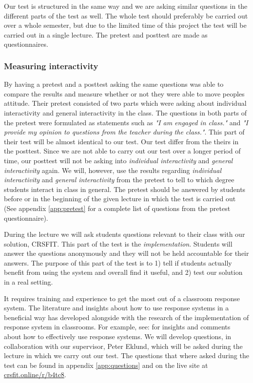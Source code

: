 Our test is structured in the same way and we are asking similar questions in the different parts of the test as well. The whole test should preferably be carried out over a whole semester, but due to the limited time of this project the test will be carried out in a single lecture. The pretest and posttest are made as questionnaires. 


\subsubsection*{Measuring interactivity}
By having a pretest and a posttest asking the same questions  was able to compare the results and measure whether or not they were able to move peoples attitude. Their pretest consisted of two parts which were asking about individual interactivity and general interactivity in the class. The questions in both parts of the pretest were formulated as statements such as \emph{"I am engaged in class."} and \emph{"I provide my opinion to questions from the teacher during the class."}. This part of their test will be almost identical to our test. Our test differ from the theirs in the posttest. Since we are not able to carry out our test over a longer period of time, our posttest will not be asking into \emph{individual interactivity} and \emph{general interactivity} again. We will, however, use the results regarding \emph{individual interactivity} and \emph{general interactivity} from the pretest to tell to which degree students interact in class in general. The pretest should be answered by students before or in the beginning of the given lecture in which the test is carried out (See appendix \ref{app:pretest} for a complete list of questions from the pretest questionnaire). 

During the lecture we will ask students questions relevant to their class with our solution, CRSFIT. This part of the test is the \emph{implementation}. Students will answer the questions anonymously and they will not be held accountable for their answers. The purpose of this part of the test is to 1) tell if students actually benefit from using the system and overall find it useful, and 2) test our solution in a real setting.

It requires training and experience to get the most out of a classroom response system. The literature and insights about how to use response systems in a beneficial way has developed alongside with the research of the implementation of response system in classrooms. For example, see: \cite{lantz2014effectiveness,draper2004increasing,lin2011implementing} for insights and comments about how to effectively use response systems. We will develop questions, in collaboration with our supervisor, Peter Eklund, which will be asked during the lecture in which we carry out our test.
The questions that where asked during the test can be found in appendix \ref{app:questions} and on the live site at \url{crsfit.online/r/b4tc8}.


